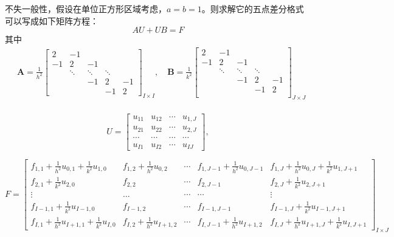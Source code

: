 \documentclass[fontset=mac]{ctexart}
\begin{document}
	不失一般性，假设在单位正方形区域考虑，$a=b=1$。则求解它的五点差分格式可以写成如下矩阵方程：
	$$
	AU+UB=F
	$$
	其中
	$$
	\begin{aligned}
		&\boldsymbol{A}=\frac{1}{h^{2}}\left[\begin{array}{ccccc}
			2 & -1 & & & \\
			-1 & 2 & -1 & & \\
			& \ddots & \ddots & \ddots & \\
			& & -1 & 2 & -1 \\
			& & & -1 & 2
		\end{array}\right]_{I \times I}, \quad \boldsymbol{B}=\frac{1}{k^{2}}\left[\begin{array}{ccccc}
			2 & -1 & & & \\
			-1 & 2 & -1 & & \\
			& \ddots & \ddots & \ddots & \\
			& &  -1 & 2 & -1 \\
			& &  & -1 & 2 \\
		\end{array}\right]_{J \times J}\\ 
	\end{aligned}
	$$
		
		$$
		U=\left[\begin{array}{cccc}
			u_{11} & u_{12} & \cdots & u_{1, J} \\
			u_{21} & u_{22} & \cdots & u_{2, J} \\
			\cdots & \cdots & \cdots & \cdots \\
			u_{I 1} & u_{I 2} & \cdots & u_{I J}
		\end{array}\right],
		$$
		
		$$
		F=\left[\begin{array}{ccccc}
			f_{1,1}+\frac{1}{h^{2}} u_{0,1}+\frac{1}{k^{2}} u_{1,0} & f_{1,2}+\frac{1}{h^{2}} u_{0,2} & \cdots & f_{1, J-1}+\frac{1}{h^{2}} u_{0, J-1} & f_{1, J}+\frac{1}{h^{2}} u_{0, J}+\frac{1}{k^{2}} u_{1, J+1} \\
			f_{2,1}+\frac{1}{k^{2}} u_{2,0} & f_{2,2} & \cdots & f_{2, J-1} & f_{2, J}+\frac{1}{k^{2}} u_{2, J+1} \\
			\vdots & \ldots & \cdots & \cdots & \vdots \\
			f_{I-1,1}+\frac{1}{k^{2}} u_{I-1,0} & f_{I-1,2} & \cdots & f_{I-1, J-1} & f_{I-1, J}+\frac{1}{k^{2}} u_{I-1, J+1} \\
			f_{I, 1}+\frac{1}{h^{2}} u_{I+1,1}+\frac{1}{k^{2}} u_{I, 0} & f_{I, 2}+\frac{1}{h^{2}} u_{I+1,2} & \cdots & f_{I, J-1}+\frac{1}{h^{2}} u_{I+1,2} & f_{I, J}+\frac{1}{h^{2}} u_{I+1, J}+\frac{1}{k^{2}} u_{I, J+1}
		\end{array}\right]_{I \times J}
		$$
		
\end{document}
